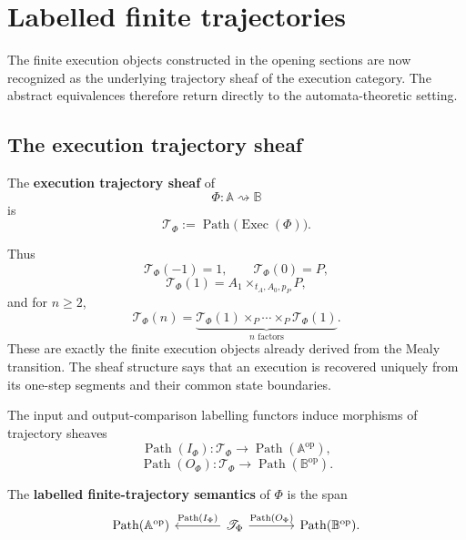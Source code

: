 \section{Labelled finite trajectories}
\label{sec:temporal-execution-semantics}

The finite execution objects constructed in the opening sections are now
recognized as the underlying trajectory sheaf of the execution category. The
abstract equivalences therefore return directly to the automata-theoretic
setting.

\subsection{The execution trajectory sheaf}
\label{subsec:temporal-execution-sheaf}

\begin{definition}
\label{def:temporal-execution-sheaf}
The \textbf{execution trajectory sheaf} of
\[
    \Phi:\mathbb A\rightsquigarrow\mathbb B
\]
is
\[
    \mathscr T_\Phi
    :=
    \operatorname{Path}
    \bigl(
        \operatorname{Exec}(\Phi)
    \bigr).
\]
\end{definition}

Thus
\[
    \mathscr T_\Phi(-1)=1,
    \qquad
    \mathscr T_\Phi(0)=P,
\]
\[
    \mathscr T_\Phi(1)
    =
    A_1\times_{t_A,A_0,p_P}P,
\]
and for \(n\geq2\),
\[
    \mathscr T_\Phi(n)
    =
    \underbrace{
    \mathscr T_\Phi(1)
    \times_P\cdots\times_P
    \mathscr T_\Phi(1)
    }_{n\text{ factors}}.
\]
These are exactly the finite execution objects already derived from the Mealy
transition. The sheaf structure says that an execution is recovered uniquely
from its one-step segments and their common state boundaries.

The input and output-comparison labelling functors induce morphisms of
trajectory sheaves
\[
    \operatorname{Path}(I_\Phi):
    \mathscr T_\Phi
    \to
    \operatorname{Path}(\mathbb A^{\mathrm{op}}),
\]
\[
    \operatorname{Path}(O_\Phi):
    \mathscr T_\Phi
    \to
    \operatorname{Path}(\mathbb B^{\mathrm{op}}).
\]

\begin{definition}
\label{def:labelled-temporal-execution-semantics}
The \textbf{labelled finite-trajectory semantics} of \(\Phi\) is the span
\[
\begin{tikzcd}[column sep=large]
    \operatorname{Path}(\mathbb A^{\mathrm{op}})
    &
    \mathscr T_\Phi
        \arrow[l, "{\operatorname{Path}(I_\Phi)}"']
        \arrow[r, "{\operatorname{Path}(O_\Phi)}"]
    &
    \operatorname{Path}(\mathbb B^{\mathrm{op}}).
\end{tikzcd}
\]
\end{definition}

